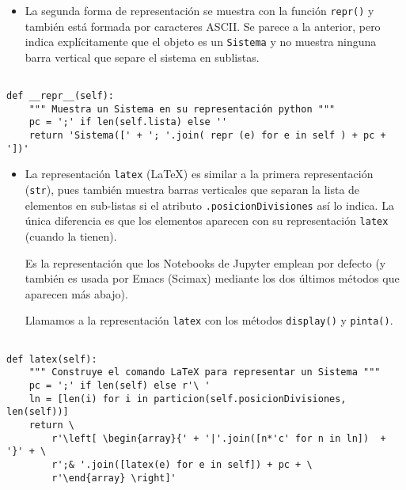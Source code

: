 \documentclass[11pt]{report}
\begin{document}
\begin{itemize}
\item La segunda forma de representación se muestra con la función
\texttt{repr()} y también está formada por caracteres ASCII. Se parece a la
anterior, pero indica explícitamente que el objeto es un \texttt{Sistema} y
no muestra ninguna barra vertical que separe el sistema en
sublistas.
\end{itemize}


\begin{verbatim}

def __repr__(self):
    """ Muestra un Sistema en su representación python """
    pc = ';' if len(self.lista) else ''
    return 'Sistema([' + '; '.join( repr (e) for e in self ) + pc + '])'

\end{verbatim}


\begin{itemize}
\item La representación \texttt{latex} (\LaTeX{}) es similar a la primera
representación (\texttt{str}), pues también muestra barras
verticales que separan la lista de elementos en sub-listas si el
atributo \texttt{.posicionDivisiones} así lo indica. La única diferencia es que los
elementos aparecen con su representación \texttt{latex} (cuando la
tienen).

Es la representación que los Notebooks de Jupyter emplean por
defecto (y también es usada por Emacs (Scimax) mediante los dos
últimos métodos que aparecen más abajo).

Llamamos a la representación \texttt{latex} con los métodos \texttt{display()} y
\texttt{pinta()}.
\end{itemize}

\begin{verbatim}

def latex(self):
    """ Construye el comando LaTeX para representar un Sistema """
    pc = ';' if len(self) else r'\ '
    ln = [len(i) for i in particion(self.posicionDivisiones, len(self))]                                                           
    return \
        r'\left[ \begin{array}{' + '|'.join([n*'c' for n in ln])  + '}' + \
        r';& '.join([latex(e) for e in self]) + pc + \
        r'\end{array} \right]'

\end{verbatim}
\end{document}
